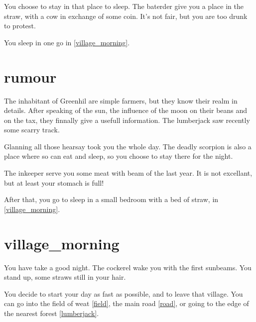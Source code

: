 You choose to stay in that place to sleep. The baterder give you a place in the
straw, with a cow in exchange of some coin. It's not fair, but you are too drunk
to protest.

You sleep in one go in \ref{village_morning}.

\section{rumour}

The inhabitant of Greenhil are simple farmers, but they know their realm in
details. After speaking of the sun, the influence of the moon on their beans and
on the tax, they finnally give a usefull information. The lumberjack saw
recently some scarry track.

Glanning all those hearsay took you the whole day. The deadly scorpion is also a
place where so can eat and sleep, so you choose to stay there for the night.

The inkeeper serve you some meat with beam of the last year. It is not
excellant, but at least your stomach is full!

After that, you go to sleep in a small bedroom with a bed of straw, in
\ref{village_morning}.

\section{village_morning}

You have take a good night. The cockerel wake you with the first sunbeams. You
stand up, some straws still in your hair.

You decide to start your day as fast as possible, and to leave that village.
You can go into the field of weat \ref{field}, the main road \ref{road}, or
going to the edge of the nearest forest \ref{lumberjack}. %

